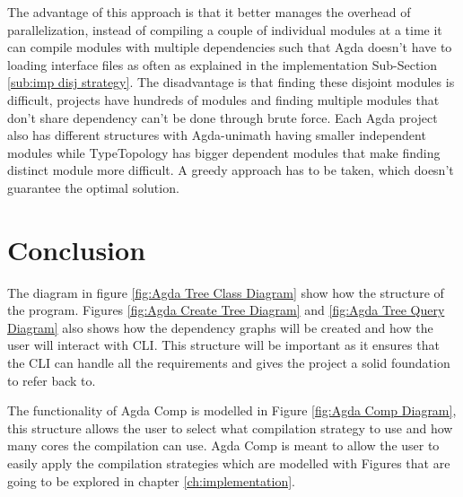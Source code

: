 The advantage of this approach is that it better manages the overhead of
parallelization, instead of compiling a couple of individual modules at a time
it can compile modules with multiple dependencies such that Agda doesn't have
to loading interface files as often as explained in the implementation
Sub-Section \ref{sub:imp disj strategy}. The disadvantage is that finding these
disjoint modules is difficult, projects  have hundreds of modules and finding
multiple modules that don't share dependency can't be done through brute force.
Each Agda project also has different structures with Agda-unimath having
smaller independent modules while TypeTopology has bigger dependent modules
that make finding distinct module more difficult. A greedy approach has to be
taken, which doesn't guarantee the optimal solution.



\pagebreak

\section{Conclusion}

The diagram in figure \ref{fig:Agda Tree Class Diagram} show how the structure
of the program. Figures \ref{fig:Agda Create Tree Diagram} and \ref{fig:Agda
Tree Query Diagram} also shows how the dependency graphs will be created and
how the user will interact with CLI. This structure will be important as it
ensures that the CLI can handle all the requirements and gives the project a
solid foundation to refer back to. 

The functionality of Agda Comp is modelled in Figure \ref{fig:Agda Comp
Diagram}, this structure allows the user to select what compilation strategy to
use and how many cores the compilation can use. Agda Comp is meant to allow the
user to easily apply the compilation strategies which are modelled with Figures that are going to be explored
in chapter \ref{ch:implementation}.

%

